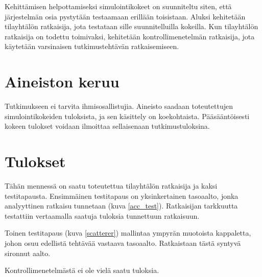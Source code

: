 \documentclass[utf8]{gradu3}
\begin{document}
Kehittämisen helpottamiseksi simulointikokeet on suunniteltu siten,
että järjestelmän osia pystytään testaamaan erillään toisistaan.
Aluksi kehitetään tilayhtälön ratkaisija, jota testataan sille suunnitelluilla kokeilla.
Kun tilayhtälön ratkaisija on todettu toimivaksi, kehitetään kontrollimenetelmän ratkaisija,
jota käytetään varsinaisen tutkimustehtävän ratkaisemiseen.

\chapter{Aineiston keruu}

Tutkimukseen ei tarvita ihmisosallistujia.
Aineisto saadaan toteutettujen simulointikokeiden tuloksista,
ja sen käsittely on koekohtaista.
Pääsääntöisesti kokeen tulokset voidaan ilmoittaa sellaisenaan tutkimustuloksina.

\chapter{Tulokset}

Tähän mennessä on saatu toteutettua tilayhtälön ratkaisija
ja kaksi testitapausta.
Ensimmäinen testitapaus on yksinkertainen tasoaalto,
jonka analyyttinen ratkaisu tunnetaan (kuva \ref{acc_test}).
Ratkaisijan tarkkuutta testattiin vertaamalla saatuja tuloksia
tunnettuun ratkaisuun.

Toinen testitapaus (kuva \ref{scatterer}) mallintaa ympyrän muotoista kappaletta,
johon osuu edellistä tehtävää vastaava tasoaalto.
Ratkaistaan tästä syntyvä sironnut aalto.

Kontrollimenetelmästä ei ole vielä saatu tuloksia.
\end{document}
